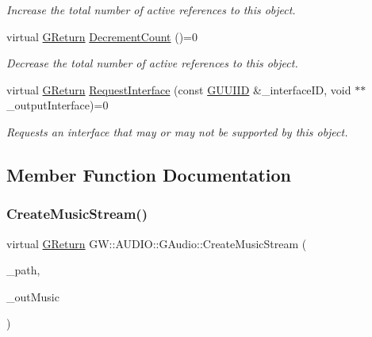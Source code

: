 \begin{DoxyCompactItemize}
\begin{DoxyCompactList}\small\item\em Increase the total number of active references to this object. \end{DoxyCompactList}\item 
virtual \mbox{\hyperlink{namespace_g_w_a67a839e3df7ea8a5c5686613a7a3de21}{G\+Return}} \mbox{\hyperlink{class_g_w_1_1_a_u_d_i_o_1_1_g_audio_a9bdc3d4a8668b702db98dde91a0fa423}{Decrement\+Count}} ()=0
\begin{DoxyCompactList}\small\item\em Decrease the total number of active references to this object. \end{DoxyCompactList}\item 
virtual \mbox{\hyperlink{namespace_g_w_a67a839e3df7ea8a5c5686613a7a3de21}{G\+Return}} \mbox{\hyperlink{class_g_w_1_1_a_u_d_i_o_1_1_g_audio_a29561ad9852a36dd14746adbaac21c80}{Request\+Interface}} (const \mbox{\hyperlink{struct_g_w_1_1_g_u_u_i_i_d}{G\+U\+U\+I\+ID}} \&\+\_\+interface\+ID, void $\ast$$\ast$\+\_\+output\+Interface)=0
\begin{DoxyCompactList}\small\item\em Requests an interface that may or may not be supported by this object. \end{DoxyCompactList}\end{DoxyCompactItemize}


\subsection{Member Function Documentation}
\mbox{\label{class_g_w_1_1_a_u_d_i_o_1_1_g_audio_a7a09604e225f901a67748faa3723b2c8}} 
\subsubsection{\texorpdfstring{Create\+Music\+Stream()}{CreateMusicStream()}}
{\footnotesize\ttfamily virtual \mbox{\hyperlink{namespace_g_w_a67a839e3df7ea8a5c5686613a7a3de21}{G\+Return}} G\+W\+::\+A\+U\+D\+I\+O\+::\+G\+Audio\+::\+Create\+Music\+Stream (\begin{DoxyParamCaption}\item[{const char $\ast$}]{\+\_\+path,  }\item[{\mbox{\hyperlink{class_g_w_1_1_a_u_d_i_o_1_1_g_music}{G\+Music}} $\ast$$\ast$}]{\+\_\+out\+Music }\end{DoxyParamCaption})\hspace{0.3cm}{\ttfamily [pure virtual]}}



